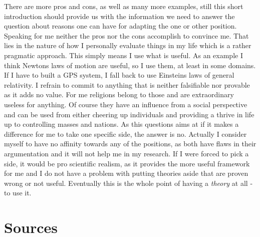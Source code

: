 \documentclass[11pt]{scrartcl}
\begin{document}
There are more pros and cons, as well as many more examples, still this short introduction should provide us with the information we need to answer the question about reasons one can have for adapting the one or other position. Speaking for me neither the pros nor the cons accomplish to convince me. That lies in the nature of how I personally evaluate things in my life which is a rather pragmatic approach. This simply means I use what is useful. As an example I think Newtons laws of motion are useful, so I use them, at least in some domains. If I have to built a GPS system, I fall back to use Einsteins laws of general relativity. I refrain to commit to anything that is neither falsifiable nor provable as it adds no value. For me religions belong to those and are extraordinary useless for anything. Of course they have an influence from a social perspective and can be used from either cheering up individuals and providing a thrive in life up to controlling masses and nations. As this questions aims at if it makes a difference for me to take one specific side, the answer is no. Actually I consider myself to have no affinity towards any of the positions, as both have flaws in their argumentation and it will not help me in my research. If I were forced to pick a side, it would be pro scientific realism, as it provides the more useful framework for me and I do not have a problem with putting theories aside that are proven wrong or not useful. Eventually this is the whole point of having a \textit{theory} at all - to use it.

\section{Sources}



\end{document}
